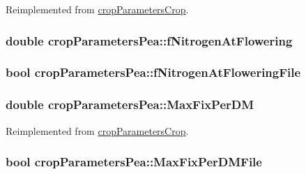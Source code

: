 Reimplemented from \hyperlink{classcrop_parameters_crop_a453e9378c9d3abae8b3b23ac4416bf64}{cropParametersCrop}.\hypertarget{classcrop_parameters_pea_a999b4a373fa436b494bac0e71ffc6dbc}{
\subsubsection[{fNitrogenAtFlowering}]{\setlength{\rightskip}{0pt plus 5cm}double {\bf cropParametersPea::fNitrogenAtFlowering}}}
\label{classcrop_parameters_pea_a999b4a373fa436b494bac0e71ffc6dbc}
\hypertarget{classcrop_parameters_pea_adc17adea05fb284c84074d6596362b88}{
\subsubsection[{fNitrogenAtFloweringFile}]{\setlength{\rightskip}{0pt plus 5cm}bool {\bf cropParametersPea::fNitrogenAtFloweringFile}}}
\label{classcrop_parameters_pea_adc17adea05fb284c84074d6596362b88}
\hypertarget{classcrop_parameters_pea_ac9c83b3f12c1de96b8093bdd2549e30c}{
\subsubsection[{MaxFixPerDM}]{\setlength{\rightskip}{0pt plus 5cm}double {\bf cropParametersPea::MaxFixPerDM}}}
\label{classcrop_parameters_pea_ac9c83b3f12c1de96b8093bdd2549e30c}


Reimplemented from \hyperlink{classcrop_parameters_crop_ad3c7743c096df81c1328482d475c30fc}{cropParametersCrop}.\hypertarget{classcrop_parameters_pea_a3da0138ad9c2d5717bce0a420e52c39a}{
\subsubsection[{MaxFixPerDMFile}]{\setlength{\rightskip}{0pt plus 5cm}bool {\bf cropParametersPea::MaxFixPerDMFile}}}
\label{classcrop_parameters_pea_a3da0138ad9c2d5717bce0a420e52c39a}


